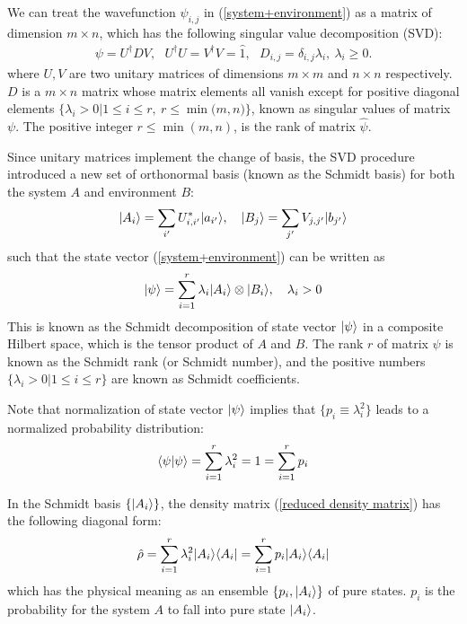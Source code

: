 We can treat the wavefunction $\psi_{i,j}$ in (\ref{system+environment}) as a matrix of dimension $m\times n$, which has the following singular value decomposition (SVD):
\begin{align}
\psi=U^\dagger DV,~~~U^\dagger U=V^\dagger V=\hat 1,~~~D_{i,j}=\delta_{i,j}\lambda_i,~\lambda_i\geq0.
\end{align}
where $U,V$ are two unitary matrices of dimensions $m\times m$ and $n\times n$ respectively. $D$ is a $m\times n$ matrix whose matrix elements all vanish except for positive diagonal elements $\{\lambda_i>0|1\leq i\leq r,~r\leq\min({m,n)}\}$, known as singular values of matrix $\psi$. The positive integer $r\leq\min{(m,n)}$, is the rank of matrix $\hat\psi$. 

Since unitary matrices implement the change of basis, the SVD procedure introduced a new set of orthonormal basis (known as the Schmidt basis) for both the system $A$ and environment $B$:
\begin{align}
|{A_i}\rangle=\sum_{i^\prime}U^\ast_{i,i^\prime}|{a_{i^\prime}}\rangle,~~~|{B_j}\rangle=\sum_{j^\prime}V_{j,j^\prime}|{b_{j^\prime}}\rangle
\end{align}
such that the state vector (\ref{system+environment}) can be written as
\begin{align}
|{\psi}\rangle=\sum_{i=1}^r\lambda_i|{A_i}\rangle\otimes|{B_i}\rangle,~~~\lambda_i>0
\end{align}
This is known as the Schmidt decomposition of state vector $|{\psi}\rangle$ in a composite Hilbert space, which is the tensor product of $A$ and $B$. The rank $r$ of matrix $\psi$ is known as the Schmidt rank (or Schmidt number), and the positive numbers $\{\lambda_i>0|1\leq i\leq r\}$ are known as Schmidt coefficients. 



Note that normalization of state vector $|{\psi}\rangle$ implies that $\{p_i\equiv\lambda_i^2\}$ leads to a normalized probability distribution:
\begin{align}
\langle{\psi|\psi}\rangle=\sum_{i=1}^r\lambda_i^2=1=\sum_{i=1}^r p_i
\end{align}


In the Schmidt basis $\{|{A_i}\rangle\}$, the density matrix (\ref{reduced density matrix}) has the following diagonal form:
\begin{align}\label{ensemble of state}
\hat\rho=\sum_{i=1}^r\lambda_i^2|{A_i}\rangle\langle{A_i}|=\sum_{i=1}^rp_i|{A_i}\rangle\langle{A_i}|
\end{align}
which has the physical meaning as an ensemble $\{p_i,|{A_i}\rangle\}$ of pure states. $p_i$ is the probability for the system $A$ to fall into pure state $|{A_i}\rangle$. 

